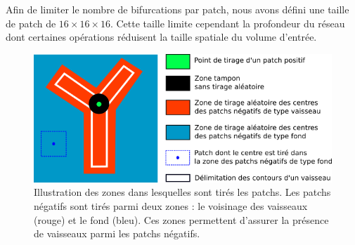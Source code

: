 Afin de limiter le nombre de bifurcations par patch, nous avons défini une taille de patch de $16 \times 16 \times 16$. Cette taille limite cependant la profondeur du réseau dont certaines opérations réduisent la taille spatiale du volume d'entrée.
\begin{figure}[!ht]
    \centering
    \includegraphics[width=\textwidth]{Images/drawing_patch_area.png}
    \caption{Illustration des zones dans lesquelles sont tirés les patchs. Les patchs négatifs sont tirés parmi deux zones : le voisinage des vaisseaux (rouge) et le fond (bleu). Ces zones permettent d'assurer la présence de vaisseaux parmi les patchs négatifs.}
    \label{fig:drawing_patch_area}
\end{figure}

